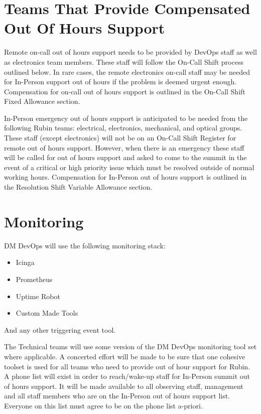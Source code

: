 \section{Teams That Provide Compensated Out Of Hours Support}

Remote on-call out of hours support needs to be provided by DevOps staff as well as electronics team members.  
These staff will follow the On-Call Shift process outlined below.  
In rare cases, the remote electronics on-call staff may be needed for In-Person support out of hours if the problem is deemed urgent enough.  
Compensation for on-call out of hours support is outlined in the On-Call Shift Fixed Allowance section.

In-Person emergency out of hours support is anticipated to be needed from the following Rubin teams:  electrical, electronics, mechanical, and optical groups.  
These staff (except electronics) will not be on an On-Call Shift Register for remote out of hours support.  
However, when there is an emergency these staff will be called for out of hours support and asked to come to the summit in the event of a critical or high priority issue which must be resolved outside of normal working hours.  
Compensation for In-Person out of hours support is outlined in the Resolution Shift Variable Allowance section.

\section{Monitoring}

DM DevOps will use the following monitoring stack:

\begin{itemize}
    \item Icinga
    \item Prometheus
    \item Uptime Robot
    \item Custom Made Tools
\end{itemize}

And any other triggering event tool.

The Technical teams will use some version of the DM DevOps monitoring tool set where applicable.
A concerted effort will be made to be sure that one cohesive toolset is used for all teams who need to provide out of hour support for Rubin.
A phone list will exist in order to reach/wake-up staff for In-Person summit out of hours support.  
It will be made available to all observing staff, management and all staff members who are on the In-Person out of hours support list.  
Everyone on this list must agree to be on the phone list a-priori.

